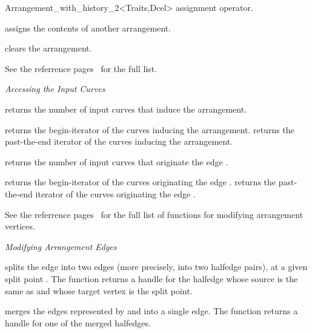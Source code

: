 \begin{ccRefClass}{Arrangement_with_history_2<Traits,Dcel>}
    {assignment operator.}

    {assigns the contents of another arrangement.}

    {clears the arrangement.}


\ccAccessFunctions

See the  referrence 
pages~ for the full list.


{\sl Accessing the Input Curves}

    {returns the number of input curves that induce the arrangement.}

    {returns the begin-iterator of the curves inducing the arrangement.}
\ccGlue    
{}
    {returns the past-the-end iterator of the curves inducing the arrangement.}
 
    {returns the number of input curves that originate the edge .}

    {returns the begin-iterator of the curves originating the edge .}
\ccGlue
{}
    {returns the past-the-end iterator  of the curves originating the edge 
     .}
    
\ccModifiers

See the  referrence
pages~ for the full
list of functions for modifying arrangement vertices.

{\sl Modifying Arrangement Edges}

  {splits the edge  into two edges (more precisely, into two halfedge
   pairs), at a given split point .
   The function returns a handle for the halfedge whose source is the same
   as  and whose target vertex is the split point.
   }

  {merges the edges represented by  and  into
   a single edge. 
   The function returns a handle for one of the merged halfedges.
   }


\end{ccRefClass}
